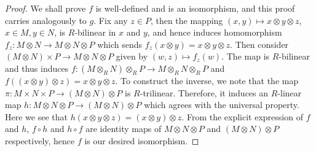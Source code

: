 \documentclass[10pt,a4paper]{amsart}
\theoremstyle{plain}
\theoremstyle{definition}
\theoremstyle{remark}
\numberwithin{equation}{subsection}
\begin{document}
\begin{proof}
We shall prove $f$ is well-defined and is an isomorphism, and this proof
carries analogously to $g$. Fix any
$z\in P$, then the mapping $(x, y)\mapsto x \otimes y \otimes z$,
$x\in M, y\in N$, is $R$-bilinear in $x$ and $y$,
and hence induces homomorphism $f_z : M \otimes N \to M \otimes N \otimes P$
which sends
$f_z(x \otimes y) = x \otimes y \otimes z$.
Then consider $(M \otimes N)\times P \to M \otimes N \otimes P$ given by
$(w, z)\mapsto f_z(w)$. The map is
$R$-bilinear and thus induces
$f : (M \otimes_R N)\otimes_R P \to M \otimes_R N \otimes_R P$
and $f((x \otimes y)\otimes z) = x \otimes y \otimes z$.
To construct the inverse, we note that the map
$\pi : M \times N \times P \to (M \otimes N)\otimes P$ is
$R$-trilinear.
Therefore, it induces an $R$-linear map
$h : M \otimes N \otimes P \to (M \otimes N)\otimes P$ which
agrees with the universal property. Here we see that
$h(x \otimes y \otimes z) = (x \otimes y)\otimes z$.
From the explicit expression of $f$ and $h$, $f\circ h$ and $h\circ f$ are
identity maps of $M \otimes N \otimes
P$ and $(M \otimes N)\otimes P$ respectively, hence $f$ is our desired
isomorphism.
\end{proof}
\end{document}
